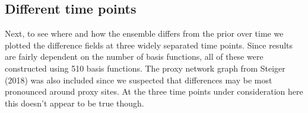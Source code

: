 \documentclass[12pt]{article}
\begin{document}
\subsection{Different time points}
Next, to see where and how the ensemble differs from the prior over time we plotted the difference fields at three widely separated time points. Since results are fairly dependent on the number of basis functions, all of these were constructed using 510 basis functions. The proxy network graph from Steiger (2018)\cite{steiger18} was also included since we suspected that differences may be most pronounced around proxy sites. At the three time points under consideration here this doesn't appear to be true though.

\begin{figure}[H]

  \hspace{-2.5cm}


\end{figure}
\end{document}
